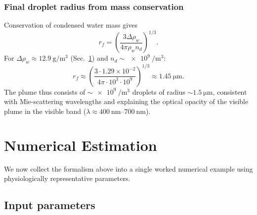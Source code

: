 \documentclass[11pt,a4paper]{article}
\theoremstyle{definition}
\theoremstyle{plain}
\begin{document}
\subsubsection{Final droplet radius from mass conservation}

Conservation of condensed water mass gives
\begin{equation}
\label{eq:rfinal}
r_f = \left(\frac{3 \Delta\rho_w}{4\pi \rho_w n_d}\right)^{1/3}.
\end{equation}
For $\Delta\rho_w \approx \SI{12.9}{\gram\per\cubic\meter}$ (Sec.~\ref{sec:numerics}) and $n_d \sim \SI{e9}{\per\cubic\meter}$:
\begin{equation}
r_f \approx \left(\frac{3 \cdot 1.29 \times 10^{-2}}{4\pi \cdot 10^3 \cdot 10^9}\right)^{1/3} \approx \SI{1.45}{\micro\meter}.
\end{equation}
The plume thus consists of $\sim\!\SI{e9}{\per\cubic\meter}$ droplets of radius $\sim\!\SI{1.5}{\micro\meter}$, consistent with Mie-scattering wavelengths and explaining the optical opacity of the visible plume in the visible band ($\lambda \approx \SIrange{400}{700}{\nano\meter}$).

\section{Numerical Estimation}
\label{sec:numerics}

We now collect the formalism above into a single worked numerical example using physiologically representative parameters.

\subsection{Input parameters}
\end{document}
